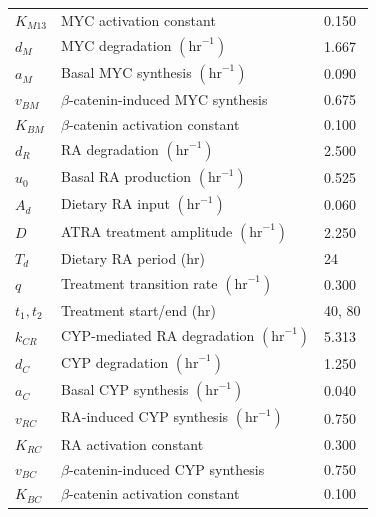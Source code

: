 \documentclass[11pt]{article}
\begin{document}
\begin{longtable}{lll}
\(K_{M13}\) & MYC activation constant & 0.150\\
\(d_M\) & MYC degradation \((\mathrm{hr}^{-1})\) & 1.667\\
\(a_M\) & Basal MYC synthesis \((\mathrm{hr}^{-1})\) & 0.090\\
\(v_{BM}\) & \(\beta\)-catenin-induced MYC synthesis & 0.675\\
\(K_{BM}\) & \(\beta\)-catenin activation constant & 0.100\\
\(d_R\) & RA degradation \((\mathrm{hr}^{-1})\) & 2.500\\
\(u_0\) & Basal RA production \((\mathrm{hr}^{-1})\) & 0.525\\
\(A_d\) & Dietary RA input \((\mathrm{hr}^{-1})\) & 0.060\\
\(D\) & ATRA treatment amplitude \((\mathrm{hr}^{-1})\) & 2.250\\
\(T_d\) & Dietary RA period (hr) & 24\\
\(q\) & Treatment transition rate \((\mathrm{hr}^{-1})\) & 0.300\\
\(t_1,t_2\) & Treatment start/end (hr) & 40, 80\\
\(k_{CR}\) & CYP-mediated RA degradation \((\mathrm{hr}^{-1})\) & 5.313\\
\(d_C\) & CYP degradation \((\mathrm{hr}^{-1})\) & 1.250\\
\(a_C\) & Basal CYP synthesis \((\mathrm{hr}^{-1})\) & 0.040\\
\(v_{RC}\) & RA-induced CYP synthesis \((\mathrm{hr}^{-1})\) & 0.750\\
\(K_{RC}\) & RA activation constant & 0.300\\
\(v_{BC}\) & \(\beta\)-catenin-induced CYP synthesis & 0.750\\
\(K_{BC}\) & \(\beta\)-catenin activation constant & 0.100\\
\end{longtable}
\end{document}
